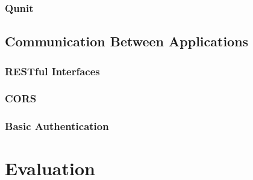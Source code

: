 \documentclass{article}
\begin{document}
\subsubsection{Qunit}

\subsection{Communication Between Applications}

\subsubsection{RESTful Interfaces}

\subsubsection{CORS}

\subsubsection{Basic Authentication}

\newpage
\section{Evaluation}

\newpage
\end{document}
